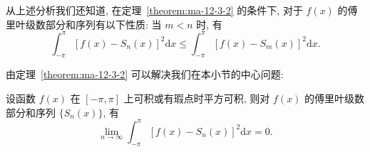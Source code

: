 \begin{remark}\label{remark:ma-12-source-40}
从上述分析我们还知道, 在定理~\ref{theorem:ma-12-3-2} 的条件下, 对于 $f(x)$ 的傅里叶级数部分和序列有以下性质: 当 $m<n$ 时, 有
\[
  \int_{-\pi}^{\pi}[f(x)-S_n(x)]^2\mathrm dx
  \leqslant
  \int_{-\pi}^{\pi}[f(x)-S_m(x)]^2\mathrm dx.
\]
\end{remark}

由定理~\ref{theorem:ma-12-3-2} 可以解决我们在本小节的中心问题:

\begin{theorem}\label{theorem:ma-12-3-3}
设函数 $f(x)$ 在 $[-\pi,\pi]$ 上可积或有瑕点时平方可积, 则对 $f(x)$ 的傅里叶级数部分和序列 $\{S_n(x)\}$, 有
\[
  \lim_{n\to\infty}\int_{-\pi}^{\pi}[f(x)-S_n(x)]^2\mathrm dx=0.
\]
\end{theorem}


